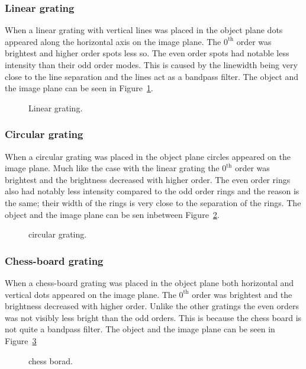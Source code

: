 \documentclass[12pt,a4paper]{article}
\begin{document}
\subsubsection{Linear grating}
When a linear grating with vertical lines was placed in the object plane dots appeared along the horizontal axis on the image plane. The $0^\text{th}$ order was brightest and higher order spots less so. The even order spots had notable less intensity than their odd order modes. This is caused by the linewidth being very close to the line separation and the lines act as a bandpass filter. The object and the image plane can be seen in Figure~\ref{fig:linear_grating}.
\begin{figure}
  \centering
  \noindent\makebox[\textwidth]{\scalebox{0.70}{}}
  \caption{Linear grating.}
  \label{fig:linear_grating}
\end{figure}

\subsubsection{Circular grating}
When a circular grating was placed in the object plane circles appeared on the image plane. Much like the case with the linear grating the $0^\text{th}$ order was brightest and the brightness decreased with higher order. The even order rings also had notably less intensity compared to the odd order rings and the reason is the same; their width of the rings is very close to the separation of the rings. The object and the image plane can be sen inbetween Figure~\ref{fig:circular_grating}.
\begin{figure}
  \centering
  \noindent\makebox[\textwidth]{\scalebox{0.70}{}}
  \caption{circular grating.}
  \label{fig:circular_grating}
\end{figure}

\subsubsection{Chess-board grating}
When a chess-board grating was placed in the object plane both horizontal and vertical dots appeared on the image plane. The $0^\text{th}$ order was brightest and the brightness decreased with higher order. Unlike the other gratings the even orders was not visibly less bright than the odd orders. This is because the chess board is not quite a bandpass filter. The object and the image plane can be seen in Figure~\ref{fig:chess_board}
\begin{figure}
  \centering
  \noindent\makebox[\textwidth]{\scalebox{0.70}{}}
  \caption{chess borad.}
  \label{fig:chess_board}
\end{figure}
\end{document}
